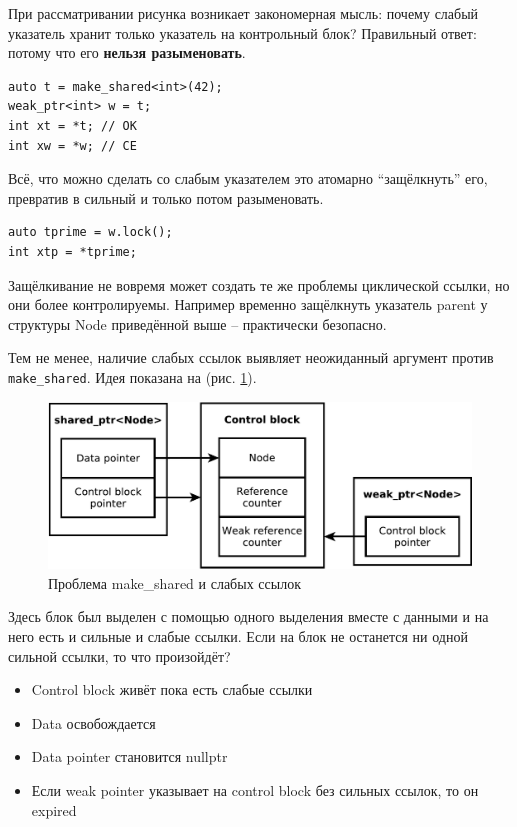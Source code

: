 \documentclass[a4paper,12pt,oneside]{article}
\begin{document}
При рассматривании рисунка возникает закономерная мысль: почему слабый указатель хранит только указатель на контрольный блок? Правильный ответ: потому что его \textbf{нельзя разыменовать}.

\begin{lstlisting}
auto t = make_shared<int>(42);
weak_ptr<int> w = t;
int xt = *t; // OK
int xw = *w; // CE
\end{lstlisting}

Всё, что можно сделать со слабым указателем это атомарно ``защёлкнуть'' его, превратив в сильный и только потом разыменовать.

\begin{lstlisting}
auto tprime = w.lock();
int xtp = *tprime;
\end{lstlisting}

Защёлкивание не вовремя может создать те же проблемы циклической ссылки, но они более контролируемы. Например временно защёлкнуть указатель parent у структуры Node приведённой выше -- практически безопасно.

Тем не менее, наличие слабых ссылок выявляет неожиданный аргумент против \lstinline!make_shared!. Идея показана на (рис. \ref{fig:smartptrs-weak-inner}).

\begin{figure}[ht]
\centering
\includegraphics[width=1.0\textwidth]{illustrations/smartptrs-weak-inner-crop.pdf}
\caption{Проблема make\_shared и слабых ссылок}
\label{fig:smartptrs-weak-inner}
\end{figure}

Здесь блок был выделен с помощью одного выделения вместе с данными и на него есть и сильные и слабые ссылки. Если на блок не останется ни одной сильной ссылки, то что произойдёт?

\begin{itemize} 
\item Control block живёт пока есть слабые ссылки
\item Data освобождается
\item Data pointer становится nullptr
\item Если weak pointer указывает на control block без сильных ссылок, то он expired
\end{itemize} 
\end{document}
